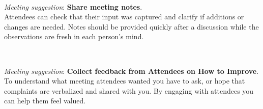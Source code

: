 \ \\
\begin{samepage}
\textit{Meeting suggestion}: \textbf{Share meeting notes}.\\
Attendees can check that their input was captured and clarify if additions or changes are needed. Notes should be provided quickly after a discussion while the observations are fresh in each person's mind.
\end{samepage}

\ \\
\begin{samepage}
\textit{Meeting suggestion}: \textbf{Collect feedback from Attendees on How to Improve}.\\
To understand what meeting attendees wanted you have to ask, or hope that complaints are verbalized and shared with you. By engaging with attendees you can help them feel valued.
\end{samepage}
